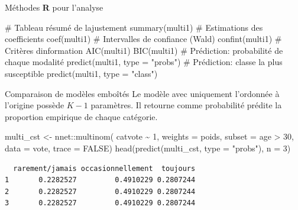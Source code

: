 \documentclass[
  ignorenonframetext,
]{beamer}
\newenvironment{Shaded}{\begin{snugshade}}{\end{snugshade}}
\newcommand{\AttributeTok}[1]{\textcolor[rgb]{0.40,0.45,0.13}{#1}}
\newcommand{\CommentTok}[1]{\textcolor[rgb]{0.37,0.37,0.37}{#1}}
\newcommand{\ConstantTok}[1]{\textcolor[rgb]{0.56,0.35,0.01}{#1}}
\newcommand{\DecValTok}[1]{\textcolor[rgb]{0.68,0.00,0.00}{#1}}
\newcommand{\FunctionTok}[1]{\textcolor[rgb]{0.28,0.35,0.67}{#1}}
\newcommand{\NormalTok}[1]{\textcolor[rgb]{0.00,0.23,0.31}{#1}}
\newcommand{\OtherTok}[1]{\textcolor[rgb]{0.00,0.23,0.31}{#1}}
\newcommand{\SpecialCharTok}[1]{\textcolor[rgb]{0.37,0.37,0.37}{#1}}
\newcommand{\StringTok}[1]{\textcolor[rgb]{0.13,0.47,0.30}{#1}}
\begin{document}
\begin{frame}[fragile]{Méthodes \textbf{R} pour l'analyse}
\protect\hypertarget{muxe9thodes-r-pour-lanalyse}{}
\begin{Shaded}
\begin{Highlighting}[numbers=left,,]
\CommentTok{\# Tableau résumé de l\textquotesingle{}ajustement}
\FunctionTok{summary}\NormalTok{(multi1)}
\CommentTok{\# Estimations des coefficients}
\FunctionTok{coef}\NormalTok{(multi1)}
\CommentTok{\# Intervalles de confiance (Wald)}
\FunctionTok{confint}\NormalTok{(multi1)}
\CommentTok{\# Critères d\textquotesingle{}information}
\FunctionTok{AIC}\NormalTok{(multi1)}
\FunctionTok{BIC}\NormalTok{(multi1)}
\CommentTok{\# Prédiction: probabilité de chaque modalité}
\FunctionTok{predict}\NormalTok{(multi1, }\AttributeTok{type =} \StringTok{"probs"}\NormalTok{)}
\CommentTok{\# Prédiction: classe la plus susceptible}
\FunctionTok{predict}\NormalTok{(multi1, }\AttributeTok{type =} \StringTok{"class"}\NormalTok{)}
\end{Highlighting}
\end{Shaded}
\end{frame}

\begin{frame}[fragile]{Comparaison de modèles emboîtés}
\protect\hypertarget{comparaison-de-moduxe8les-embouxeetuxe9s}{}
Le modèle avec uniquement l'ordonnée à l'origine possède \(K-1\)
paramètres. Il retourne comme probabilité prédite la proportion
empirique de chaque catégorie.

\begin{Shaded}
\begin{Highlighting}[numbers=left,,]
\NormalTok{multi\_cst }\OtherTok{\textless{}{-}}\NormalTok{ nnet}\SpecialCharTok{::}\FunctionTok{multinom}\NormalTok{(}
\NormalTok{  catvote }\SpecialCharTok{\textasciitilde{}} \DecValTok{1}\NormalTok{,}
  \AttributeTok{weights =}\NormalTok{ poids,}
  \AttributeTok{subset =}\NormalTok{ age }\SpecialCharTok{\textgreater{}} \DecValTok{30}\NormalTok{,}
  \AttributeTok{data =}\NormalTok{ vote,}
  \AttributeTok{trace =} \ConstantTok{FALSE}\NormalTok{)}
\FunctionTok{head}\NormalTok{(}\FunctionTok{predict}\NormalTok{(multi\_cst, }\AttributeTok{type =} \StringTok{"probs"}\NormalTok{), }\AttributeTok{n =} \DecValTok{3}\NormalTok{)}
\end{Highlighting}
\end{Shaded}

\begin{verbatim}
  rarement/jamais occasionnellement  toujours
1       0.2282527         0.4910229 0.2807244
2       0.2282527         0.4910229 0.2807244
3       0.2282527         0.4910229 0.2807244
\end{verbatim}
\end{frame}
\end{document}
